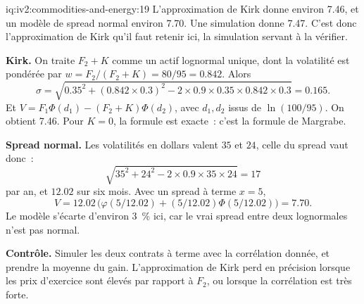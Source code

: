 \begin{solution}{iq:iv2:commodities-and-energy:19}
L'approximation de Kirk donne environ 7.46, et un modèle de spread normal environ 7.70. Une simulation donne 7.47. C'est donc l'approximation de Kirk qu'il faut retenir ici, la simulation servant à la vérifier.

\textbf{Kirk.} On traite $F_2 + K$ comme un actif lognormal unique, dont la volatilité est pondérée par $w = F_2/(F_2 + K) = 80/95 = 0.842$. Alors
\[
\sigma = \sqrt{0.35^2 + (0.842 \times 0.3)^2 - 2 \times 0.9 \times 0.35 \times 0.842 \times 0.3} = 0.165.
\]
Et $V = F_1\Phi(d_1) - (F_2 + K)\Phi(d_2)$, avec $d_1, d_2$ issus de $\ln(100/95)$. On obtient 7.46. Pour $K = 0$, la formule est exacte~: c'est la formule de Margrabe.

\textbf{Spread normal.} Les volatilités en dollars valent $35$ et $24$, celle du spread vaut donc~:
\[
\sqrt{35^2 + 24^2 - 2 \times 0.9 \times 35 \times 24} = 17
\]
par an, et $12.02$ sur six mois. Avec un spread à terme $x = 5$,
\[
V = 12.02\,\bigl(\varphi(5/12.02) + (5/12.02)\Phi(5/12.02)\bigr) = 7.70.
\]
Le modèle s'écarte d'environ 3~\% ici, car le vrai spread entre deux lognormales n'est pas normal.

\textbf{Contrôle.} Simuler les deux contrats à terme avec la corrélation donnée, et prendre la moyenne du gain. L'approximation de Kirk perd en précision lorsque les prix d'exercice sont élevés par rapport à $F_2$, ou lorsque la corrélation est très forte.

\end{solution}

